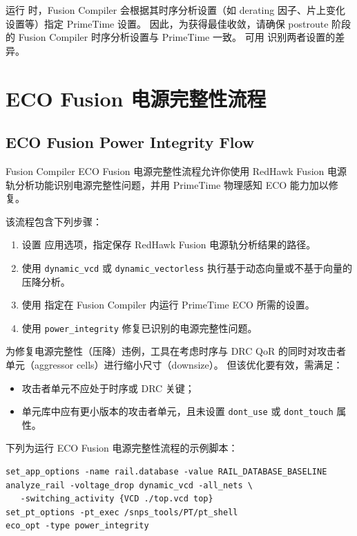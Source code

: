 \begin{noteBox}
运行  时，Fusion Compiler 会根据其时序分析设置（如 derating 因子、片上变化设置等）指定 PrimeTime 设置。
因此，为获得最佳收敛，请确保 postroute 阶段的 Fusion Compiler 时序分析设置与 PrimeTime 一致。
可用  识别两者设置的差异。
\end{noteBox}

\section{ECO Fusion 电源完整性流程}
\subsection*{ECO Fusion Power Integrity Flow}

Fusion Compiler ECO Fusion 电源完整性流程允许你使用 RedHawk Fusion 电源轨分析功能识别电源完整性问题，并用 PrimeTime 物理感知 ECO 能力加以修复。

该流程包含下列步骤：
\begin{enumerate}
  \item 设置  应用选项，指定保存 RedHawk Fusion 电源轨分析结果的路径。
  \item 使用   \texttt{dynamic\_vcd} 或   \texttt{dynamic\_vectorless} 执行基于动态向量或不基于向量的压降分析。
  \item 使用  指定在 Fusion Compiler 内运行 PrimeTime ECO 所需的设置。
  \item 使用   \texttt{power\_integrity} 修复已识别的电源完整性问题。
\end{enumerate}

为修复电源完整性（压降）违例，工具在考虑时序与 DRC QoR 的同时对攻击者单元（aggressor cells）进行缩小尺寸（downsize）。
但该优化要有效，需满足：
\begin{itemize}
  \item 攻击者单元不应处于时序或 DRC 关键；
  \item 单元库中应有更小版本的攻击者单元，且未设置 \texttt{dont\_use} 或 \texttt{dont\_touch} 属性。
\end{itemize}

下列为运行 ECO Fusion 电源完整性流程的示例脚本：
\begin{lstlisting}
set_app_options -name rail.database -value RAIL_DATABASE_BASELINE
analyze_rail -voltage_drop dynamic_vcd -all_nets \
   -switching_activity {VCD ./top.vcd top}
set_pt_options -pt_exec /snps_tools/PT/pt_shell
eco_opt -type power_integrity
\end{lstlisting}


